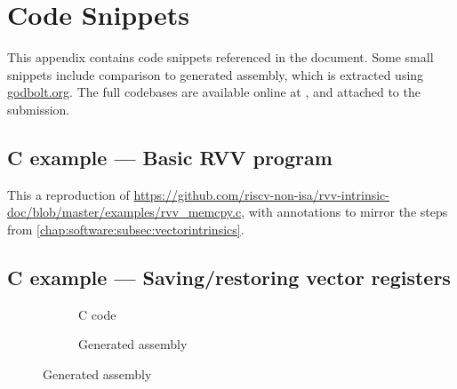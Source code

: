 \chapter{Code Snippets}
This appendix contains code snippets referenced in the document.
Some small snippets include comparison to generated assembly, which is extracted using \url{godbolt.org}.
The full codebases are available online at , and attached to the submission.


\clearpage
\pagebreak
\section{C example --- Basic RVV program}\label{example:rvv}
This a reproduction of \url{https://github.com/riscv-non-isa/rvv-intrinsic-doc/blob/master/examples/rvv_memcpy.c}, with annotations to mirror the steps from \cref{chap:software:subsec:vectorintrinsics}.

\clearpage
\pagebreak
\section{C example --- Saving/restoring vector registers}
\begin{figure}[h]
    \caption{Clang 15: Saving/restoring vector registers\\Reproduced from \url{https://godbolt.org/z/4xfMoxsT7}}\label{example:saverestore}

    \centering
    \begin{subfigure}[t]{0.8\linewidth}
        \caption{C code}
    \end{subfigure}

    \vspace{1em}
    \begin{subfigure}[t]{0.8\linewidth}
        \caption{Generated assembly}
    \end{subfigure}
\end{figure}
\clearpage

